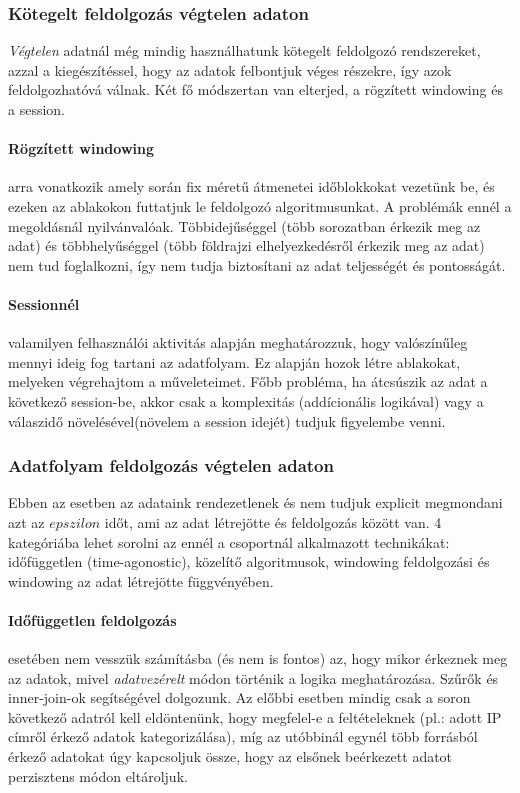 \documentclass[a4paper,12pt]{article}
\begin{document}
\subsubsection{Kötegelt feldolgozás végtelen adaton}
\textsl{Végtelen} adatnál még mindig használhatunk kötegelt feldolgozó rendszereket, azzal a kiegészítéssel, hogy az adatok felbontjuk véges részekre, így azok feldolgozhatóvá válnak. Két fő módszertan van elterjed, a rögzített windowing és a session.

\paragraph{Rögzített windowing} arra vonatkozik amely során fix méretű átmenetei időblokkokat vezetünk be, és ezeken az ablakokon futtatjuk le feldolgozó algoritmusunkat. A problémák ennél a megoldásnál nyilvánvalóak. Többidejűséggel (több sorozatban érkezik meg az adat) és többhelyűséggel (több földrajzi elhelyezkedésről érkezik meg az adat) nem tud foglalkozni, így nem tudja biztosítani az adat teljességét és pontosságát.

\paragraph{Sessionnél} valamilyen felhasználói aktivitás alapján meghatározzuk, hogy valószínűleg mennyi ideig fog tartani az adatfolyam. Ez alapján hozok létre ablakokat, melyeken végrehajtom a műveleteimet. Főbb probléma, ha átcsúszik az adat a következő session-be, akkor csak a komplexitás (addícionális logikával) vagy a válaszidő növelésével(növelem a session idejét) tudjuk figyelembe venni.

\subsubsection{Adatfolyam feldolgozás végtelen adaton}
Ebben az esetben az adataink rendezetlenek és nem tudjuk explicit megmondani azt az $epszilon$ időt, ami az adat létrejötte és feldolgozás között van. 4 kategóriába lehet sorolni az ennél a csoportnál alkalmazott technikákat: időfüggetlen (time-agonostic), közelítő algoritmusok, windowing feldolgozási és windowing az adat létrejötte függvényében. 

\paragraph{Időfüggetlen feldolgozás} esetében nem vesszük számításba (és nem is fontos) az, hogy mikor érkeznek meg az adatok, mivel \textsl{adatvezérelt} módon történik a logika meghatározása. Szűrők és inner-join-ok segítségével dolgozunk. Az előbbi esetben mindig csak a soron következő adatról kell eldöntenünk, hogy megfelel-e a feltételeknek (pl.: adott IP címről érkező adatok kategorizálása), míg az utóbbinál egynél több forrásból érkező adatokat úgy kapcsoljuk össze, hogy az elsőnek beérkezett adatot perzisztens módon eltároljuk. 
\end{document}
